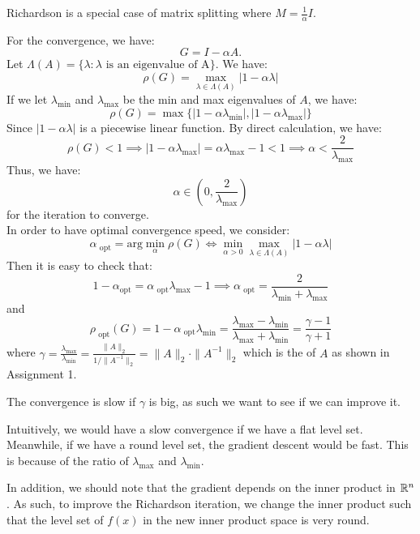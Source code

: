 \documentclass[../main/main.tex]{subfiles}
\begin{document}
  \begin{remark}
Richardson is a special case of matrix splitting where $M = \frac{1}{\alpha }I$.
  \end{remark}
  For the convergence, we have: \[
    G=I-\alpha  A.\] Let  $\Lambda (A) = \{ \lambda : \lambda  \text{ is an eigenvalue of A}\}$. We have: \[
    \rho (G) = \max _{\lambda \in \Lambda (A)}|1-\alpha \lambda |
  \]
  If we let $\lambda _{\min }$ and $\lambda _{\max }$ be the min and max eigenvalues of $A$, we have: \[
\rho (G) = \max \{|1-\alpha \lambda _{\min }|, |1-\alpha \lambda _{\max }| \}
\]Since $|1-\alpha \lambda |$ is a piecewise linear function. By direct calculation, we have: \[
\rho (G) < 1 \implies |1-\alpha \lambda _{\max }| =\alpha  \lambda _{\max } -1 < 1 \implies  \alpha  < \frac{2}{\lambda _{\max }}
\] Thus, we have:  \[
\alpha \in (0,\frac{2}{\lambda _{\max }})
\] for the iteration to converge.\\

In order to have optimal convergence speed, we consider: \[
\alpha_{\text{ opt}} = \text{arg}\min _{\alpha }\rho (G) \iff \min _{\alpha >0} \max _{\lambda \in \Lambda (A)} |1-\alpha \lambda |
\] Then it is easy to check that: \[
1-\alpha_{\text{opt}}  = \alpha _{\text{ opt}} \lambda _{\max } -1 \implies  \alpha _{\text{ opt}} = \frac{2}{\lambda _{\min }+\lambda _{\max }}
\] and \[
\rho_{\text{ opt}}(G) = 1-\alpha _{\text{ opt}} \lambda _{\min } = \frac{\lambda _{\max }-\lambda _{\min }}{\lambda _{\max }+\lambda _{\min }} = \frac{\gamma -1}{\gamma +1}
\]where $\gamma =\frac{\lambda _{\max }}{\lambda _{\min }} = \frac{\|A\|_{2}}{1 / \|A^{-1}\|_{2}} = \|A\|_{2}\cdot \|A^{-1}\|_{2}$ which is the  of $A$ as shown in Assignment 1.

\begin{remark}
The convergence is slow if $\gamma $ is big, as such we want to see if we can improve it.
\end{remark}

\begin{remark}
Intuitively, we would have a slow convergence if we have a flat level set. Meanwhile, if we have a round level set, the gradient descent would be fast. This is because of the ratio of $\lambda _{\max }$ and $\lambda _{\min }$.
\end{remark}
In addition, we should note that the gradient depends on the inner product in $\mathbb{R} ^{n}$. As such, to improve the Richardson iteration, we change the inner product such that the level set of $f(x)$ in the new inner product space is very round. \\
\end{document}
